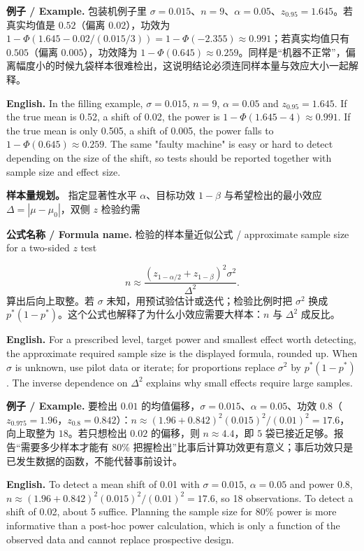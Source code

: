 \documentclass[UTF8,11pt,a4paper]{ctexart}
\newcommand{\EN}[1]{\par\noindent\textbf{English.} #1\par}
\newcommand{\FORMULA}[2]{\par\noindent\textbf{公式名称 / Formula name.} #1 / #2\par}
\newcommand{\EX}[2]{\par\noindent\textbf{例子 / Example.} #1\par\EN{#2}}
\begin{document}
\EX{包装机例子里 $\sigma=0.015$、$n=9$、$\alpha=0.05$、$z_{0.95}=1.645$。若真实均值是 $0.52$（偏离 $0.02$），功效为 $1-\Phi(1.645-0.02/(0.015/3))=1-\Phi(-2.355)\approx0.991$；若真实均值只有 $0.505$（偏离 $0.005$），功效降为 $1-\Phi(0.645)\approx0.259$。同样是“机器不正常”，偏离幅度小的时候九袋样本很难检出，这说明结论必须连同样本量与效应大小一起解释。}{In the filling example, $\sigma=0.015$, $n=9$, $\alpha=0.05$ and $z_{0.95}=1.645$. If the true mean is 0.52, a shift of 0.02, the power is $1-\Phi(1.645-4)\approx0.991$. If the true mean is only 0.505, a shift of 0.005, the power falls to $1-\Phi(0.645)\approx0.259$. The same "faulty machine" is easy or hard to detect depending on the size of the shift, so tests should be reported together with sample size and effect size.}

\noindent\textbf{样本量规划。} 指定显著性水平 $\alpha$、目标功效 $1-\beta$ 与希望检出的最小效应 $\Delta=|\mu-\mu_0|$，双侧 $z$ 检验约需
\FORMULA{检验的样本量近似公式}{approximate sample size for a two-sided $z$ test}
\[
n\approx\frac{(z_{1-\alpha/2}+z_{1-\beta})^2\sigma^2}{\Delta^2}.
\]
算出后向上取整。若 $\sigma$ 未知，用预试验估计或迭代；检验比例时把 $\sigma^2$ 换成 $p^*(1-p^*)$。这个公式也解释了为什么小效应需要大样本：$n$ 与 $\Delta^2$ 成反比。
\EN{For a prescribed level, target power and smallest effect worth detecting, the approximate required sample size is the displayed formula, rounded up. When $\sigma$ is unknown, use pilot data or iterate; for proportions replace $\sigma^2$ by $p^*(1-p^*)$. The inverse dependence on $\Delta^2$ explains why small effects require large samples.}

\EX{要检出 $0.01$ 的均值偏移，$\sigma=0.015$、$\alpha=0.05$、功效 $0.8$（$z_{0.975}=1.96$，$z_{0.8}=0.842$）：$n\approx(1.96+0.842)^2(0.015)^2/(0.01)^2=17.6$，向上取整为 $18$。若只想检出 $0.02$ 的偏移，则 $n\approx4.4$，即 $5$ 袋已接近足够。报告“需要多少样本才能有 80\% 把握检出”比事后计算功效更有意义；事后功效只是已发生数据的函数，不能代替事前设计。}{To detect a mean shift of 0.01 with $\sigma=0.015$, $\alpha=0.05$ and power 0.8, $n\approx(1.96+0.842)^2(0.015)^2/(0.01)^2=17.6$, so 18 observations. To detect a shift of 0.02, about 5 suffice. Planning the sample size for 80\% power is more informative than a post-hoc power calculation, which is only a function of the observed data and cannot replace prospective design.}
\end{document}
